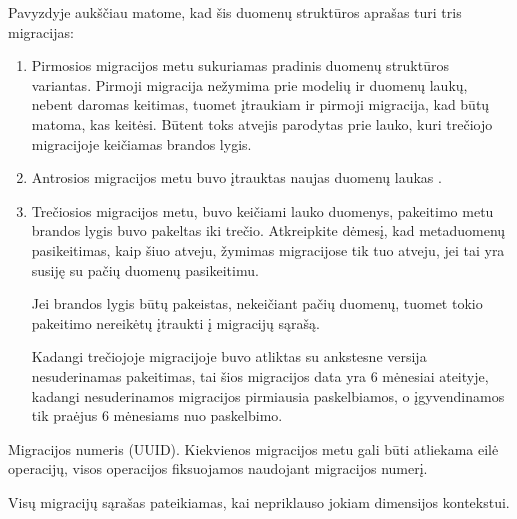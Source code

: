 \documentclass[letterpaper,10pt,lithuanian]{sphinxmanual}
\begin{document}
\sphinxAtStartPar
Pavyzdyje aukščiau matome, kad šis duomenų struktūros aprašas turi tris
migracijas:
\begin{enumerate}
%
\item {} 
\sphinxAtStartPar
Pirmosios migracijos metu sukuriamas pradinis duomenų struktūros variantas.
Pirmoji migracija nežymima prie modelių ir duomenų laukų, nebent daromas
keitimas, tuomet įtraukiam ir pirmoji migracija, kad būtų matoma, kas
keitėsi. Būtent toks atvejis parodytas prie  lauko, kuri
trečiojo migracijoje keičiamas brandos lygis.

\item {} 
\sphinxAtStartPar
Antrosios migracijos metu buvo įtrauktas naujas duomenų laukas
.

\item {} 
\sphinxAtStartPar
Trečiosios migracijos metu, buvo keičiami  lauko duomenys,
pakeitimo metu brandos lygis buvo pakeltas iki trečio. Atkreipkite dėmesį,
kad metaduomenų pasikeitimas, kaip šiuo atveju, žymimas migracijose tik tuo
atveju, jei tai yra susiję su pačių duomenų pasikeitimu.

\sphinxAtStartPar
Jei brandos lygis būtų pakeistas, nekeičiant pačių duomenų, tuomet tokio
pakeitimo nereikėtų įtraukti į migracijų sąrašą.

\sphinxAtStartPar
Kadangi trečiojoje migracijoje buvo atliktas su ankstesne versija
nesuderinamas pakeitimas, tai šios migracijos data yra 6 mėnesiai
ateityje, kadangi nesuderinamos migracijos pirmiausia paskelbiamos, o
įgyvendinamos tik praėjus 6 mėnesiams nuo paskelbimo.

\end{enumerate}

\begin{fulllineitems}
\label{\detokenize{dimensijos:migrate.id}}
\pysigstartsignatures
{}
\pysigstopsignatures
\sphinxAtStartPar
Migracijos numeris (UUID). Kiekvienos migracijos metu gali būti
atliekama eilė operacijų, visos operacijos fiksuojamos naudojant
migracijos numerį.

\sphinxAtStartPar
Visų migracijų sąrašas pateikiamas, kai {\hyperref[\detokenize{dimensijos:module-migrate}]{}} nepriklauso
jokiam dimensijos kontekstui.

\end{fulllineitems}
\end{document}
